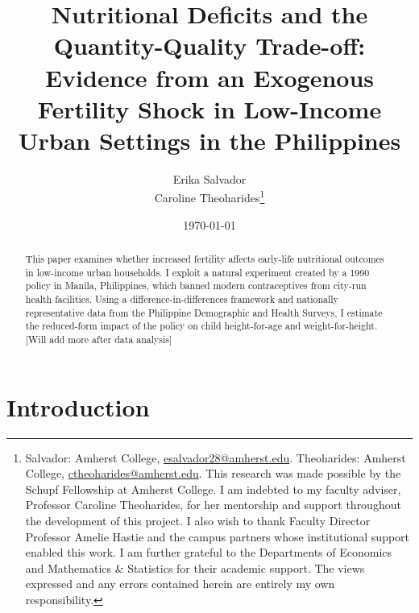 \documentclass[]{AEA}
\begin{document}
\title{Nutritional Deficits and the Quantity-Quality Trade-off: Evidence
from an Exogenous Fertility Shock in Low-Income Urban Settings in the
Philippines}


\author{
  Erika Salvador\\
  Caroline Theoharides\thanks{
  Salvador: Amherst
College, \href{mailto:esalvador28@amherst.edu}{esalvador28@amherst.edu}.
  Theoharides: Amherst
College, \href{mailto:ctheoharides@amherst.edu}{ctheoharides@amherst.edu}.
  This research was made possible by the Schupf Fellowship at Amherst
  College. I am indebted to my faculty adviser, Professor Caroline
  Theoharides, for her mentorship and support throughout the development
  of this project. I also wish to thank Faculty Director Professor
  Amelie Hastie and the campus partners whose institutional support
  enabled this work. I am further grateful to the Departments of
  Economics and Mathematics \& Statistics for their academic support.
  The views expressed and any errors contained herein are entirely my
  own responsibility.
}
}

\date{\today}
\pubVolume{}
\pubIssue{}

\begin{abstract}
This paper examines whether increased fertility affects early-life
nutritional outcomes in low-income urban households. I exploit a natural
experiment created by a 1990 policy in Manila, Philippines, which banned
modern contraceptives from city-run health facilities. Using a
difference-in-differences framework and nationally representative data
from the Philippine Demographic and Health Surveys, I estimate the
reduced-form impact of the policy on child height-for-age and
weight-for-height. {[}Will add more after data analysis{]}
\end{abstract}


\maketitle

\section{Introduction}
\end{document}
